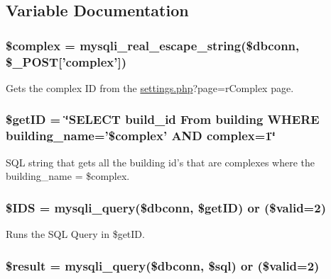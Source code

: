 \subsection{\-Variable \-Documentation}
\hypertarget{rmComplex_8php_a25ec02534214977602829622b78b5d78}{
\subsubsection[{\$complex}]{\setlength{\rightskip}{0pt plus 5cm}\$complex = mysqli\-\_\-real\-\_\-escape\-\_\-string(\$dbconn, \$\-\_\-\-P\-O\-S\-T\mbox{[}'complex'\mbox{]})}}\label{rmComplex_8php_a25ec02534214977602829622b78b5d78}
\-Gets the complex \-I\-D from the \hyperlink{settings_8php}{settings.\-php}?page=r\-Complex page. \hypertarget{rmComplex_8php_aae30003a4d3fab7dc75a19cbfddea7a8}{
\subsubsection[{\$get\-I\-D}]{\setlength{\rightskip}{0pt plus 5cm}\$get\-I\-D = \char`\"{}\-S\-E\-L\-E\-C\-T build\-\_\-id \-From building \-W\-H\-E\-R\-E building\-\_\-name='\$complex' \-A\-N\-D complex=1\char`\"{}}}\label{rmComplex_8php_aae30003a4d3fab7dc75a19cbfddea7a8}
\-S\-Q\-L string that gets all the building id's that are complexes where the building\-\_\-name = \$complex. \hypertarget{rmComplex_8php_a046621a0674ef3c7f611b85c330fe1c5}{
\subsubsection[{\$\-I\-D\-S}]{\setlength{\rightskip}{0pt plus 5cm}\$\-I\-D\-S = mysqli\-\_\-query(\$dbconn, \$get\-I\-D) or (\$valid=2)}}\label{rmComplex_8php_a046621a0674ef3c7f611b85c330fe1c5}
\-Runs the \-S\-Q\-L \-Query in \$get\-I\-D. \hypertarget{rmComplex_8php_a112ef069ddc0454086e3d1e6d8d55d07}{
\subsubsection[{\$result}]{\setlength{\rightskip}{0pt plus 5cm}\$result = mysqli\-\_\-query(\$dbconn, \$sql) or (\$valid=2)}}\label{rmComplex_8php_a112ef069ddc0454086e3d1e6d8d55d07}

